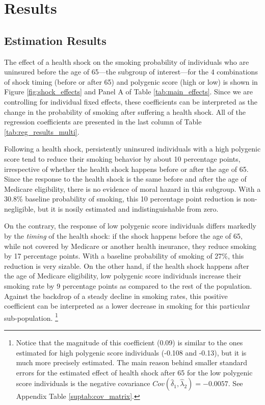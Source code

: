 \documentclass[11pt]{article}
\begin{document}
\section{Results} \label{sec:results}
\subsection{Estimation Results} \label{sec:regs}

The effect of a health shock on the smoking probability of individuals who are uninsured before the age of 65---the subgroup of interest---for the 4 combinations of shock timing (before or after 65) and polygenic score (high or low) is shown in Figure \ref{fig:shock_effects} and Panel A of Table \ref{tab:main_effects}.
Since we are controlling for individual fixed effects, these coefficients can be interpreted as the change in the probability of smoking after suffering a health shock.
All of the regression coefficients are presented in the last column of Table \ref{tab:reg_results_multi}.

Following a health shock, persistently uninsured individuals with a high polygenic score tend to reduce their smoking behavior by about 10 percentage points, irrespective of whether the health shock happens before or after the age of 65.
Since the response to the health shock is the same before and after the age of Medicare eligibility, there is no evidence of moral hazard in this subgroup.
With a 30.8\% baseline probability of smoking, this 10 percentage point reduction is non-negligible, but it is nosily estimated and indistinguishable from zero.

On the contrary, the response of low polygenic score individuals differs markedly by the \textit{timing} of the health shock: if the shock happens before the age of 65, while not covered by Medicare or another health insurance, they reduce smoking by 17 percentage points.
With a baseline probability of smoking of 27\%, this reduction is very sizable.
On the other hand, if the health shock happens after the age of Medicare eligibility, low polygenic score individuals increase their smoking rate by 9 percentage points as compared to the rest of the population.
Against the backdrop of a steady decline in smoking rates, this positive coefficient can be interpreted as a lower decrease in smoking for this particular sub-population.%
\footnote{Notice that the magnitude of this coefficient (0.09) is similar to the ones estimated for high polygenic score individuals (-0.108 and -0.13), but it is much more precisely estimated. The main reason behind smaller standard errors for the estimated effect of health shock after 65 for the low polygenic score individuals is the negative covariance $Cov(\hat{\delta}_1,\hat{\lambda}_2) =  -0.0057$. See Appendix Table \ref{suptab:cov_matrix}. %
}
\end{document}
